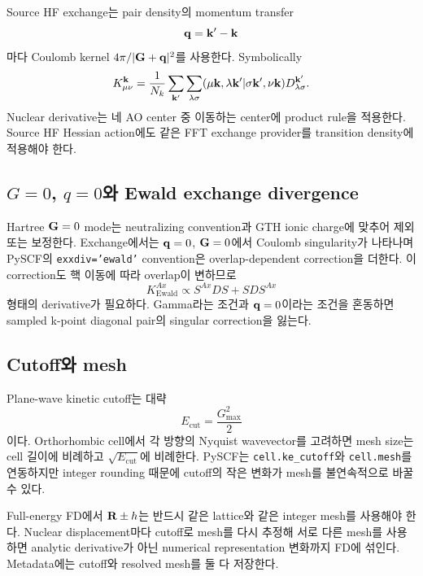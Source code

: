Source HF exchange는 pair density의 momentum transfer
\begin{equation}
  \mathbf{q}=\mathbf{k}'-\mathbf{k}
  \label{eq:fftdf-momentum-transfer}
\end{equation}
마다 Coulomb kernel $4\pi/|\mathbf{G}+\mathbf{q}|^2$를 사용한다. Symbolically
\begin{equation}
  K_{\mu\nu}^{\mathbf{k}}
  =\frac{1}{N_k}\sum_{\mathbf{k}'}\sum_{\lambda\sigma}
   (\mu\mathbf{k},\lambda\mathbf{k}'|\sigma\mathbf{k}',\nu\mathbf{k})
   D_{\lambda\sigma}^{\mathbf{k}'}.
  \label{eq:fftdf-exchange}
\end{equation}
Nuclear derivative는 네 AO center 중 이동하는 center에 product rule을 적용한다. Source
HF Hessian action에도 같은 FFT exchange provider를 transition density에 적용해야 한다.

\subsection{\texorpdfstring{$G=0$, $q=0$}{G=0, q=0}와 Ewald exchange divergence}

Hartree $\mathbf{G}=0$ mode는 neutralizing convention과 GTH ionic charge에 맞추어 제외 또는
보정한다. Exchange에서는 $\mathbf{q}=0$, $\mathbf{G}=0$에서 Coulomb singularity가 나타나며 PySCF의
\texttt{exxdiv='ewald'} convention은 overlap-dependent correction을 더한다. 이 correction도
핵 이동에 따라 overlap이 변하므로
\begin{equation}
  K_{\mathrm{Ewald}}^{Ax}
  \propto S^{Ax}DS+SDS^{Ax}
  \label{eq:fftdf-ewald-exchange-derivative}
\end{equation}
형태의 derivative가 필요하다. Gamma라는 조건과 $\mathbf{q}=0$이라는 조건을 혼동하면 sampled
k-point diagonal pair의 singular correction을 잃는다.

\subsection{Cutoff와 mesh}

Plane-wave kinetic cutoff는 대략
\begin{equation}
  E_{\mathrm{cut}}=\frac{G_{\max}^2}{2}
  \label{eq:cutoff-definition}
\end{equation}
이다. Orthorhombic cell에서 각 방향의 Nyquist wavevector를 고려하면 mesh size는 cell
길이에 비례하고 $\sqrt{E_{\mathrm{cut}}}$에 비례한다. PySCF는
\texttt{cell.ke\_cutoff}와 \texttt{cell.mesh}를 연동하지만 integer rounding 때문에
cutoff의 작은 변화가 mesh를
불연속적으로 바꿀 수 있다.

Full-energy FD에서 $\mathbf{R}\pm h$는 반드시 같은 lattice와 같은 integer mesh를 사용해야
한다. Nuclear displacement마다 cutoff로 mesh를 다시 추정해 서로 다른 mesh를 사용하면
analytic derivative가 아닌 numerical representation 변화까지 FD에 섞인다. Metadata에는
cutoff와 resolved mesh를 둘 다 저장한다.

